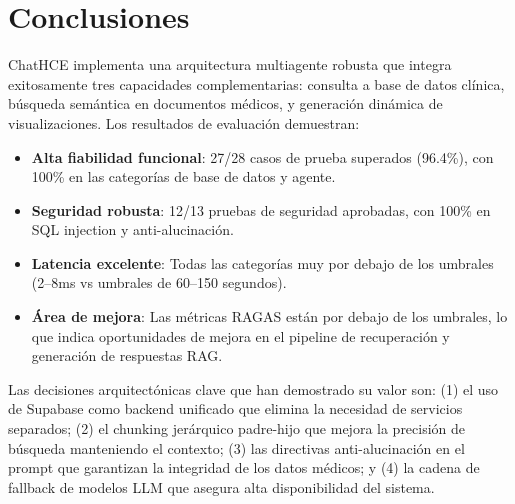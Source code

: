 ﻿\documentclass[11pt,a4paper]{article}
\begin{document}
\section{Conclusiones}

ChatHCE implementa una arquitectura multiagente robusta que integra exitosamente tres capacidades complementarias: consulta a base de datos cl\'inica, b\'usqueda sem\'antica en documentos m\'edicos, y generaci\'on din\'amica de visualizaciones. Los resultados de evaluaci\'on demuestran:

\begin{itemize}
  \item \textbf{Alta fiabilidad funcional}: 27/28 casos de prueba superados (96.4\%), con 100\% en las categor\'ias de base de datos y agente.
  \item \textbf{Seguridad robusta}: 12/13 pruebas de seguridad aprobadas, con 100\% en SQL injection y anti-alucinaci\'on.
  \item \textbf{Latencia excelente}: Todas las categor\'ias muy por debajo de los umbrales (2--8ms vs umbrales de 60--150 segundos).
  \item \textbf{\'Area de mejora}: Las m\'etricas RAGAS est\'an por debajo de los umbrales, lo que indica oportunidades de mejora en el pipeline de recuperaci\'on y generaci\'on de respuestas RAG.
\end{itemize}

Las decisiones arquitect\'onicas clave que han demostrado su valor son: (1) el uso de Supabase como backend unificado que elimina la necesidad de servicios separados; (2) el chunking jer\'arquico padre-hijo que mejora la precisi\'on de b\'usqueda manteniendo el contexto; (3) las directivas anti-alucinaci\'on en el prompt que garantizan la integridad de los datos m\'edicos; y (4) la cadena de fallback de modelos LLM que asegura alta disponibilidad del sistema.
\end{document}
